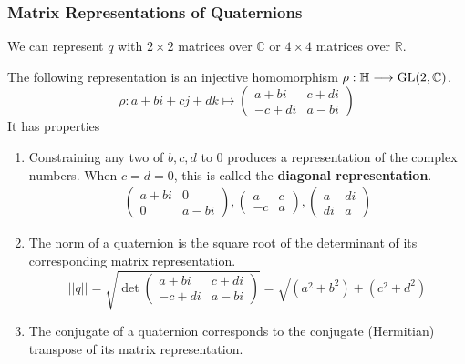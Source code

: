 \subsubsection{Matrix Representations of Quaternions}

  We can represent $q$ with $2 \times 2$ matrices over $\mathbb{C}$ or $4\times 4 $ matrices over $\mathbb{R}$. 

  \begin{theorem}
    The following representation is an injective homomorphism $\rho: \mathbb{H} \longrightarrow \operatorname{GL}(2, \mathbb{C})$. 
    \begin{equation}
      \rho: a + bi + cj + dk \mapsto \begin{pmatrix}
      a+bi & c+ di \\ -c + di & a - bi
      \end{pmatrix}
    \end{equation}
    It has properties
    \begin{enumerate}
      \item Constraining any two of $b, c, d$ to $0$ produces a representation of the complex numbers. When $c = d = 0$, this is called the \textbf{diagonal representation}. 
      \begin{align*}
        \begin{pmatrix}
        a+bi & 0 \\ 0 & a-bi
        \end{pmatrix},  \begin{pmatrix}
        a & c \\ -c & a
        \end{pmatrix},  \begin{pmatrix}
        a & di \\ di & a
        \end{pmatrix}
      \end{align*}
      \item The norm of a quaternion is the square root of the determinant of its corresponding matrix representation. 
        \begin{equation}
          ||q|| = \sqrt{\det \begin{pmatrix}
          a+bi & c+di \\ -c+di & a-bi
          \end{pmatrix}} = \sqrt{(a^2 + b^2) + (c^2 + d^2)}
        \end{equation}
      \item The conjugate of a quaternion corresponds to the conjugate (Hermitian) transpose of its matrix representation. 

\end{enumerate}
\end{theorem}
